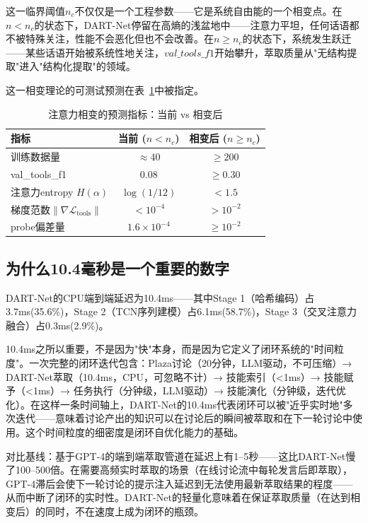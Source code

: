 \documentclass[twocolumn,10.5pt]{ctexart}
\def\cL{\mathcal{L}}
\begin{document}
这一临界阈值$n_c$不仅仅是一个工程参数——它是系统自由能的一个相变点。在$n < n_c$的状态下，DART-Net停留在高熵的浅盆地中——注意力平坦，任何话语都不被特殊关注，性能不会恶化但也不会改善。在$n \geq n_c$的状态下，系统发生跃迁——某些话语开始被系统性地关注，$val\_tools\_f1$开始攀升，萃取质量从"无结构提取"进入"结构化提取"的领域。

这一相变理论的可测试预测在表~\ref{tab:phase}中被指定。

\begin{table}[t]
\centering
\caption{注意力相变的预测指标：当前 vs 相变后}
\label{tab:phase}
\setlength{\tabcolsep}{2pt}
\renewcommand{\arraystretch}{1.15}
\begin{tabular}{lcc}
\toprule
指标 & 当前 ($n < n_c$) & 相变后 ($n \geq n_c$) \\
\midrule
训练数据量 & $\approx 40$ & $\geq 200$ \\
val\_tools\_f1 & 0.08 & $\geq 0.30$ \\
注意力entropy $H(\alpha)$ & $\log(1/12)$ & $< 1.5$ \\
梯度范数$\|\nabla \cL_{\text{tools}}\|$ & $< 10^{-4}$ & $> 10^{-2}$ \\
probe偏差量 & $1.6\times 10^{-4}$ & $\geq 10^{-2}$ \\
\bottomrule
\end{tabular}
\end{table}

\subsection{为什么10.4毫秒是一个重要的数字}

DART-Net的CPU端到端延迟为10.4ms——其中Stage 1（哈希编码）占3.7ms(35.6\%)，Stage 2（TCN序列建模）占6.1ms(58.7\%)，Stage 3（交叉注意力融合）占0.3ms(2.9\%)。

10.4ms之所以重要，不是因为"快"本身，而是因为它定义了闭环系统的"时间粒度"。一次完整的闭环迭代包含：Plaza讨论（20分钟，LLM驱动，不可压缩）→ DART-Net萃取（10.4ms，CPU，可忽略不计）→ 技能索引（<1ms）→ 技能赋予（<1ms）→ 任务执行（分钟级，LLM驱动）→ 技能演化（分钟级，迭代优化）。在这样一条时间轴上，DART-Net的10.4ms代表闭环可以被"近乎实时地"多次迭代——意味着讨论产出的知识可以在讨论后的瞬间被萃取和在下一轮讨论中使用。这个时间粒度的细密度是闭环自优化能力的基础。

对比基线：基于GPT-4的端到端萃取管道在延迟上有1--5秒——这比DART-Net慢了100--500倍。在需要高频实时萃取的场景（在线讨论流中每轮发言后即萃取），GPT-4滞后会使下一轮讨论的提示注入延迟到无法使用最新萃取结果的程度——从而中断了闭环的实时性。DART-Net的轻量化意味着在保证萃取质量（在达到相变后）的同时，不在速度上成为闭环的瓶颈。
\end{document}
